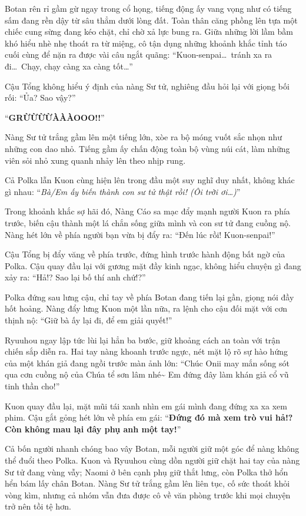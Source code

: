 \documentclass[../main.tex]{subfiles}
\begin{document}
Botan rên rỉ gầm gừ ngay trong cổ họng, tiếng động ấy vang vọng như có tiếng sấm đang rền dậy từ sâu thẳm dưới lòng đất. Toàn thân căng phồng lên tựa một chiếc cung sừng đang kéo chặt, chỉ chờ xả lực bung ra. Giữa những lời lầm bầm khó hiểu nhè nhẹ thoát ra từ miệng, cô tận dụng những khoảnh khắc tỉnh táo cuối cùng để nặn ra được vài câu ngắt quãng: ``Kuon-senpai\dots\ tránh xa ra đi\dots\ Chạy, chạy càng xa càng tốt\dots''

Cậu Tổng không hiểu ý định của nàng Sư tử, nghiêng đầu hỏi lại với giọng bối rối: ``Ủa? Sao vậy?''

``{\Large\textbf{GRỪỪỪỪÀÀÀOOO!!}}''

Nàng Sư tử trắng gầm lên một tiếng lớn, xòe ra bộ móng vuốt sắc nhọn như những con dao nhỏ. Tiếng gầm ấy chấn động toàn bộ vùng núi cát, làm những viên sỏi nhỏ xung quanh nhảy lên theo nhịp rung.


Cả Polka lẫn Kuon cùng hiện lên trong đầu một suy nghĩ duy nhất, không khác gì nhau: ``\textit{Bà/Em ấy biến thành con sư tử thật rồi! (Ôi trời ơi\dots)}''

Trong khoảnh khắc sợ hãi đó, Nàng Cáo sa mạc đẩy mạnh người Kuon ra phía trước, biến cậu thành một lá chắn sống giữa mình và con sư tử đang cuồng nộ. Nàng hét lớn về phía người bạn vừa bị đẩy ra: ``Đến lúc rồi! Kuon-senpai!''

Cậu Tổng bị đẩy văng về phía trước, đứng hình trước hành động bất ngờ của Polka. Cậu quay đầu lại với gương mặt đầy kinh ngạc, không hiểu chuyện gì đang xảy ra: ``Hả!? Sao lại bố thí anh chứ!?''

Polka đứng sau lưng cậu, chỉ tay về phía Botan đang tiến lại gần, giọng nói đầy hốt hoảng. Nàng đẩy lưng Kuon một lần nữa, ra lệnh cho cậu đối mặt với cơn thịnh nộ: ``Giữ bà ấy lại đi, để em giải quyết!''

Ryuuhou ngay lập tức lùi lại hẳn ba bước, giữ khoảng cách an toàn với trận chiến sắp diễn ra. Hai tay nàng khoanh trước ngực, nét mặt lộ rõ sự hào hứng của một khán giả đang ngồi trước màn ảnh lớn: ``Chúc Onii may mắn sống sót qua cơn cuồng nộ của Chúa tể sơn lâm nhé\~{} Em đứng đây làm khán giả cổ vũ tinh thần cho!''

Kuon quay đầu lại, mặt mũi tái xanh nhìn em gái mình đang đứng xa xa xem phim. Cậu gắt gỏng hét lớn về phía em gái: ``\textbf{Đứng đó mà xem trò vui hả!? Còn không mau lại đây phụ anh một tay!}''

Cả bốn người nhanh chóng bao vây Botan, mỗi người giữ một góc để nàng không thể đuổi theo Polka. Kuon và Ryuuhou cùng dồn người giữ chặt hai tay của nàng Sư tử đang vùng vẫy; Naomi ở bên cạnh phụ giữ thắt lưng, còn Polka thở hổn hển bám lấy chân Botan. Nàng Sư tử trắng gầm lên liên tục, cố sức thoát khỏi vòng kìm, nhưng cả nhóm vẫn đưa được cô về văn phòng trước khi mọi chuyện trở nên tồi tệ hơn.
\end{document}
